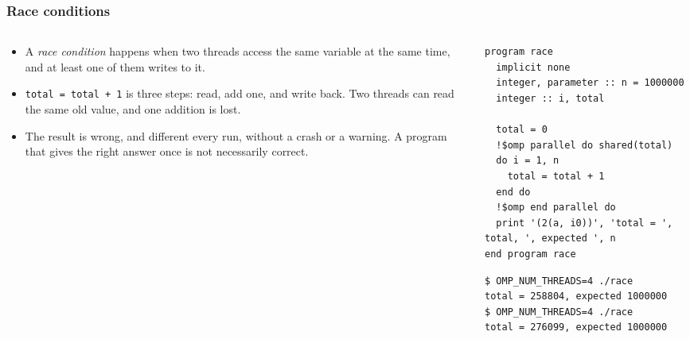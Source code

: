 \begin{frame}[fragile]
  \frametitle{Race conditions}
  \begin{columns}[T]
    \begin{column}{0.44\textwidth}
      \begin{itemize}
        \item A \emph{race condition} happens when two threads access the same variable at the same time, and at least one of them writes to it.
        \item \texttt{total = total + 1} is three steps: read, add one, and write back. Two threads can read the same old value, and one addition is lost.
        \item The result is wrong, and different every run, without a crash or a warning. A program that gives the right answer once is not necessarily correct.
      \end{itemize}
    \end{column}

    \begin{column}{0.56\textwidth}
      \begin{lstlisting}
program race
  implicit none
  integer, parameter :: n = 1000000
  integer :: i, total

  total = 0
  !$omp parallel do shared(total)
  do i = 1, n
    total = total + 1
  end do
  !$omp end parallel do
  print '(2(a, i0))', 'total = ', total, ', expected ', n
end program race
      \end{lstlisting}

      \begin{lstlisting}[language=bash]
$ OMP_NUM_THREADS=4 ./race
total = 258804, expected 1000000
$ OMP_NUM_THREADS=4 ./race
total = 276099, expected 1000000
      \end{lstlisting}
    \end{column}
  \end{columns}
\end{frame}



